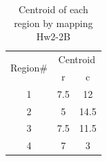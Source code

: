 \documentclass[a4paper]{article}
\begin{document}
\begin{table}[h]
	\centering
	\caption{Centroid of each region by mapping Hw2-2B}
	\begin{tabular}{|c|c|c|}
		\hline
		\multirow{2}[4]{*}{Region\#} &  \multicolumn{2}{c|}{Centroid} \bigstrut\\
		\cline{2-3}            & r     & c \bigstrut\\
	 \hline
	 1     & 7.5 & 12 \bigstrut\\
	 \hline
	 2     & 5 & 14.5 \bigstrut\\
	 \hline
	 3     & 7.5 & 11.5 \bigstrut\\
	 \hline
	 4     & 7 & 3   \bigstrut\\
	 \hline
	 
	\end{tabular}%
	\label{table: centroid mapped}%
\end{table}%
\end{document}
